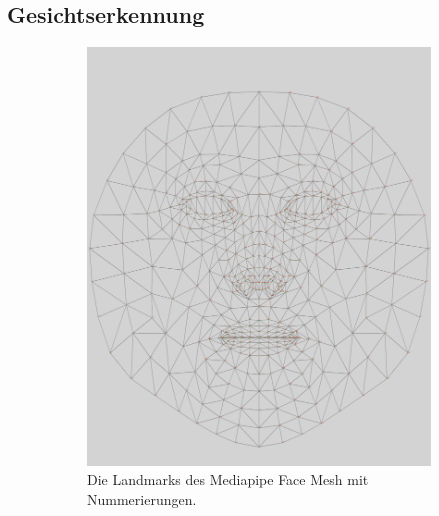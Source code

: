\subsection{Gesichtserkennung}
\label{sec:facedetection}

\begin{figure}
    \centering
    \begin{subfigure}{0.3\textwidth}
        \includegraphics[width=\linewidth]{images/MPFaceMesh1.png}
        \caption{Die Landmarks des Mediapipe Face Mesh mit Nummerierungen.}
        \label{fig:MPFaceMesh1}
    \end{subfigure}
    \hfill
    \begin{subfigure}{0.3\textwidth}

\end{subfigure}
\end{figure}
